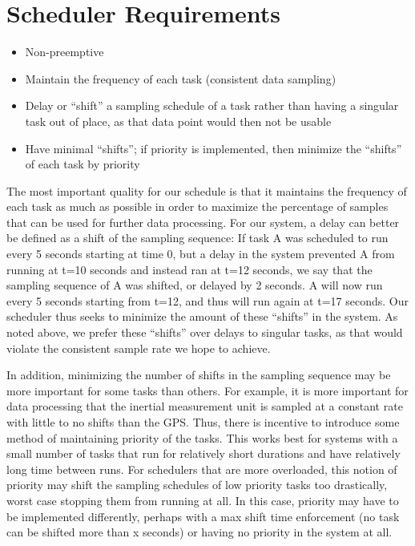 \documentclass{article}
\begin{document}
\section{Scheduler Requirements}
\begin{itemize}
    \item Non-preemptive
    \item Maintain the frequency of each task (consistent data  sampling)
    \item Delay or “shift” a sampling schedule of a task rather than having a singular task out of place, as that data point would then not be usable
    \item Have minimal “shifts”; if priority is implemented, then minimize the “shifts” of each task by priority
\end{itemize}

The most important quality for our schedule is that it maintains the frequency of each task as much as possible in order to maximize the percentage of samples that can be used for further data processing. For our system, a delay can better be defined as a shift of the sampling sequence: If task A was scheduled to run every 5 seconds starting at time 0, but a delay in the system prevented A from running at t=10 seconds and instead ran at t=12 seconds, we say that the sampling sequence of A was shifted, or delayed by 2 seconds. A will now run every 5 seconds starting from t=12, and thus will run again at t=17 seconds. Our scheduler thus seeks to minimize the amount of these “shifts” in the system. As noted above, we prefer these “shifts” over delays to singular tasks, as that would violate the consistent sample rate we hope to achieve.


In addition, minimizing the number of shifts in the sampling sequence may be more important for some tasks than others. For example, it is more important for data processing that the inertial measurement unit is sampled at a constant rate with little to no shifts than the GPS. Thus, there is incentive to introduce some method of maintaining priority of the tasks. This works best for systems with a small number of tasks that run for relatively short durations and have relatively long time between runs. For schedulers that are more overloaded, this notion of priority may shift the sampling schedules of low priority tasks too drastically, worst case stopping them from running at all. In this case, priority may have to be implemented differently, perhaps with a max shift time enforcement (no task can be shifted more than x seconds) or having no priority in the system at all.
\end{document}
